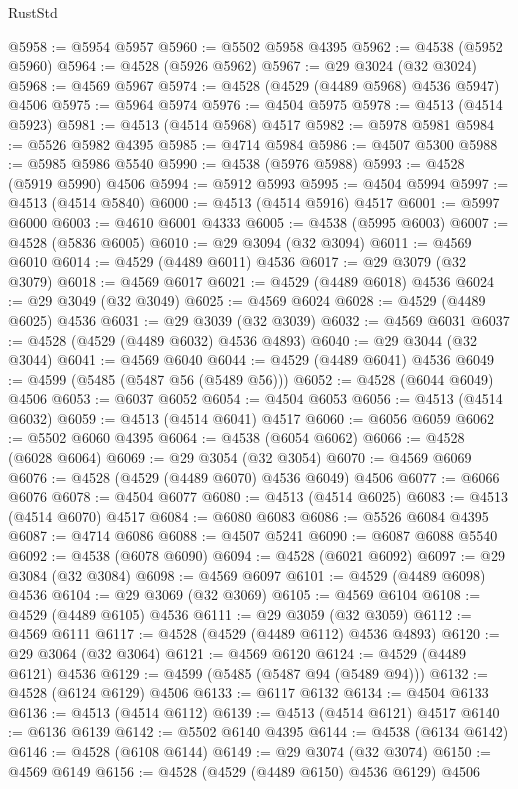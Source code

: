 \begin{lexlean}{RustStd}
\begin{coremodule}
@5958 := @5954 @5957
@5960 := @5502 @5958 @4395
@5962 := @4538 (@5952 @5960)
@5964 := @4528 (@5926 @5962)
@5967 := @29 @3024 (@32 @3024)
@5968 := @4569 @5967
@5974 := @4528 (@4529 (@4489 @5968) @4536 @5947) @4506
@5975 := @5964 @5974
@5976 := @4504 @5975
@5978 := @4513 (@4514 @5923)
@5981 := @4513 (@4514 @5968) @4517
@5982 := @5978 @5981
@5984 := @5526 @5982 @4395
@5985 := @4714 @5984
@5986 := @4507 @5300
@5988 := @5985 @5986 @5540
@5990 := @4538 (@5976 @5988)
@5993 := @4528 (@5919 @5990) @4506
@5994 := @5912 @5993
@5995 := @4504 @5994
@5997 := @4513 (@4514 @5840)
@6000 := @4513 (@4514 @5916) @4517
@6001 := @5997 @6000
@6003 := @4610 @6001 @4333
@6005 := @4538 (@5995 @6003)
@6007 := @4528 (@5836 @6005)
@6010 := @29 @3094 (@32 @3094)
@6011 := @4569 @6010
@6014 := @4529 (@4489 @6011) @4536
@6017 := @29 @3079 (@32 @3079)
@6018 := @4569 @6017
@6021 := @4529 (@4489 @6018) @4536
@6024 := @29 @3049 (@32 @3049)
@6025 := @4569 @6024
@6028 := @4529 (@4489 @6025) @4536
@6031 := @29 @3039 (@32 @3039)
@6032 := @4569 @6031
@6037 := @4528 (@4529 (@4489 @6032) @4536 @4893)
@6040 := @29 @3044 (@32 @3044)
@6041 := @4569 @6040
@6044 := @4529 (@4489 @6041) @4536
@6049 := @4599 (@5485 (@5487 @56 (@5489 @56)))
@6052 := @4528 (@6044 @6049) @4506
@6053 := @6037 @6052
@6054 := @4504 @6053
@6056 := @4513 (@4514 @6032)
@6059 := @4513 (@4514 @6041) @4517
@6060 := @6056 @6059
@6062 := @5502 @6060 @4395
@6064 := @4538 (@6054 @6062)
@6066 := @4528 (@6028 @6064)
@6069 := @29 @3054 (@32 @3054)
@6070 := @4569 @6069
@6076 := @4528 (@4529 (@4489 @6070) @4536 @6049) @4506
@6077 := @6066 @6076
@6078 := @4504 @6077
@6080 := @4513 (@4514 @6025)
@6083 := @4513 (@4514 @6070) @4517
@6084 := @6080 @6083
@6086 := @5526 @6084 @4395
@6087 := @4714 @6086
@6088 := @4507 @5241
@6090 := @6087 @6088 @5540
@6092 := @4538 (@6078 @6090)
@6094 := @4528 (@6021 @6092)
@6097 := @29 @3084 (@32 @3084)
@6098 := @4569 @6097
@6101 := @4529 (@4489 @6098) @4536
@6104 := @29 @3069 (@32 @3069)
@6105 := @4569 @6104
@6108 := @4529 (@4489 @6105) @4536
@6111 := @29 @3059 (@32 @3059)
@6112 := @4569 @6111
@6117 := @4528 (@4529 (@4489 @6112) @4536 @4893)
@6120 := @29 @3064 (@32 @3064)
@6121 := @4569 @6120
@6124 := @4529 (@4489 @6121) @4536
@6129 := @4599 (@5485 (@5487 @94 (@5489 @94)))
@6132 := @4528 (@6124 @6129) @4506
@6133 := @6117 @6132
@6134 := @4504 @6133
@6136 := @4513 (@4514 @6112)
@6139 := @4513 (@4514 @6121) @4517
@6140 := @6136 @6139
@6142 := @5502 @6140 @4395
@6144 := @4538 (@6134 @6142)
@6146 := @4528 (@6108 @6144)
@6149 := @29 @3074 (@32 @3074)
@6150 := @4569 @6149
@6156 := @4528 (@4529 (@4489 @6150) @4536 @6129) @4506

\end{coremodule}
\end{lexlean}
